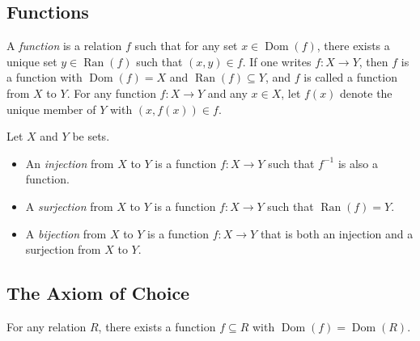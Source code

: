 \documentclass[11pt]{article}
\DeclareMathOperator{\dom}{Dom}
\DeclareMathOperator{\ran}{Ran}
\begin{document}
\subsection{Functions}
\begin{definition}
  A \emph{function} is a relation $f$ such that for any set $x \in \dom(f)$, there exists a unique set $y \in \ran(f)$ such that $(x, y) \in f$.
  If one writes $f: X \to Y$, then $f$ is a function with $\dom(f) = X$ and $\ran(f) \subseteq Y$, and $f$ is called a function from $X$ to $Y$.
  For any function $f: X \to Y$ and any $x \in X$, let $f(x)$ denote the unique member of $Y$ with $(x, f(x)) \in f$.
\end{definition}

\begin{definition}
  Let $X$ and $Y$ be sets.
  \begin{itemize}
    \item An \emph{injection} from $X$ to $Y$ is a function $f: X \to Y$ such that $f^{-1}$ is also a function.
    \item A \emph{surjection} from $X$ to $Y$ is a function $f: X \to Y$ such that $\ran(f) = Y$.
    \item A \emph{bijection} from $X$ to $Y$ is a function $f: X \to Y$ that is both an injection and a surjection from $X$ to $Y$.
  \end{itemize}
\end{definition}

\subsection{The Axiom of Choice}
\begin{axiom}[Choice]
  For any relation $R$, there exists a function $f \subseteq R$ with $\dom(f) = \dom(R)$.
\end{axiom}
\end{document}
